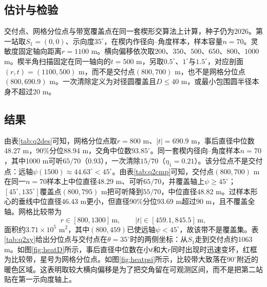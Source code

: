 \documentclass{cumcmthesis}
\begin{document}
\subsection{估计与检验}

交付点、网格分位点与带宽覆盖点在同一套楔形交算法上计算，种子仍为2026。第一站取$S_1=(0,0)$、示向度$35^\circ$，在楔内作径向--角度样本，样本容量$n=70$。灵敏度固定轴向距离$r=1100$ m。横向偏移依次取$200$、$350$、$500$、$650$、$800$、$1000$ m。楔半角扫描固定在同一轴向的$t=500$ m，另取$0.5^\circ$、$1^\circ$与$1.5^\circ$，对应剖面$(r,t)=(1100,500)$ m，而不是交付点$(800,700)$ m，也不是网格分位点$(800,690.9)$ m。一次清除定义为对径圆覆盖且$D\le 40$ m，或最小包围圆半径本身不超过20 m。

\subsection{结果}

由表\ref{tab:q2des}可知，网格分位点取$r=800$ m、$|t|=690.9$ m，事后直径中位数48.27 m，90\%分位88.94 m，交角中位数$93.85^\circ$。同一套楔内径向--角度样本$n=70$，其中1000 m可听$65/70$（0.93），一次清除$15/70$（$\eta_1=0.21$）。该分位点不是交付点：远轴$\psi(1500)\approx 44.63^\circ<45^\circ$。由表\ref{tab:q2cmp}可知，交付点$(800,700)$ m在同一$n=70$样本上中位直径48.29 m、可听$65/70$，并覆盖轴上$\psi\ge 45^\circ$；$[45^\circ,135^\circ]$覆盖点$(800,795)$ m把可听降到$55/70$，中位直径48.82 m。过样本形心的垂线中位直径46.43 m更小，但直径90\%分位93.69 m超过90 m，且不覆盖全轴。网格比较带为
\[
r\in[800,1300]\,\mathrm{m},\qquad |t|\in[459.1,845.5]\,\mathrm{m},
\]
面积约$3.71\times 10^{5}$ m$^2$，其中$(800,459)$已使远轴$\psi<45^\circ$，故该带不是覆盖集。表\ref{tab:q2xy}给出分位点与交付点在$\theta=35^\circ$时的两侧坐标：从$S_1$走到交付点约1063 m。如图\ref{fig:heatD}所示，事后直径中位数在小$t$和大$r$同时出现时迅速变坏，红框为比较带，星号为网格分位点。如图\ref{fig:heatpsi}所示，比较带大致落在$90^\circ$附近的暖色区域。这表明取较大横向偏移是为了把交角留在可观测区间，而不是把第二站贴在第一示向度轴上。
\end{document}
